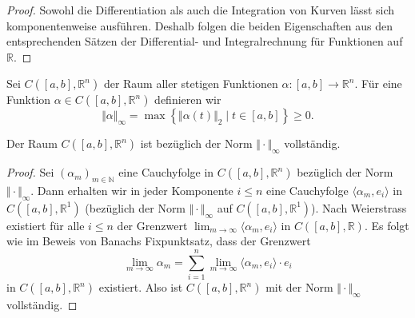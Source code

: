 \documentclass[../main.tex]{subfiles}
\begin{document}
\begin{proof}
  Sowohl die Differentiation als auch die Integration von Kurven
  lässt sich komponentenweise ausführen.
  Deshalb folgen die beiden Eigenschaften aus den entsprechenden
  Sätzen der Differential- und Integralrechnung für Funktionen
  auf $\mathbb{R}$.
\end{proof}

Sei $C([a, b], \mathbb{R}^n)$ der Raum aller stetigen
Funktionen $\alpha \colon [a, b] \to \mathbb{R}^n$.
Für eine Funktion $\alpha \in C([a, b], \mathbb{R}^n)$ definieren wir
\[
  \Vert \alpha \Vert_{\infty}
  = \max \left\{\Vert \alpha(t) \Vert_2 \mid 
  t \in [a, b]\right\} \geq 0.
\]

\begin{lemma}
  Der Raum $C([a, b], \mathbb{R}^n)$ ist bezüglich der Norm
  $\Vert \cdot \Vert_{\infty}$ vollständig.
\end{lemma}

\begin{proof}
  Sei ${(\alpha_{m})}_{m \in \mathbb{N}}$ 
  eine Cauchyfolge in $C([a, b], \mathbb{R}^n)$ bezüglich der Norm 
  $\Vert \cdot \Vert_{\infty}$.
  Dann erhalten wir in jeder Komponente $i \leq n$ 
  eine Cauchyfolge $\langle \alpha_m, e_i \rangle$ 
  in $C([a, b], \mathbb{R}^1)$ (bezüglich der Norm
  $\Vert \cdot \Vert_{\infty}$ auf $C([a, b], \mathbb{R}^1)$).
  Nach Weierstrass existiert für alle $i \leq n$ 
  der Grenzwert
  $\lim_{m \to \infty} \langle \alpha_m, e_i \rangle$ 
  in $C([a, b], \mathbb{R})$.
  Es folgt
  wie im Beweis von Banachs Fixpunktsatz, dass der Grenzwert
  \[
    \lim_{m \to \infty} \alpha_m
    = \sum_{i=1}^{n} \lim_{m \to \infty}
    \langle \alpha_m, e_i \rangle \cdot e_i 
  \]
  in $C([a, b], \mathbb{R}^n)$ existiert.
  Also ist $C([a, b], \mathbb{R}^n)$ mit der Norm $\Vert \cdot \Vert_\infty$ vollständig.
\end{proof}
\end{document}
